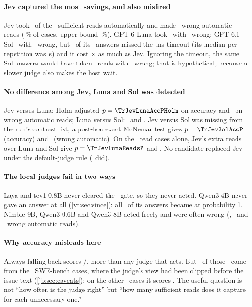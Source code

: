 \paragraph{Jev captured the most savings, and also misfired} Jev took \TrJevReads\ of the \TrReadCases\
sufficient reads automatically and made \TrJevWaK\ wrong automatic reads (\TrJevWaPct\,\% of cases, upper
bound \TrJevWaUpper\,\%). GPT-6 Luna took \TrLunaReads\ with \TrLunaWaK\ wrong; GPT-6.1 Sol \TrSolReads\
with \TrSolWaK\ wrong, but \TrSolTimeouts\ of its \TrSolAnswers\ answers missed the \TrTimeoutMs\,ms timeout
(its median per repetition was \TrSolPfiftyRangeS\,s) and it cost \TrSolJevCostX$\times$ as much as Jev.
Ignoring the timeout, the same Sol answers would have taken \TrSolNoTimeoutReads\ reads with
\TrSolNoTimeoutWa\ wrong; that is hypothetical, because a slower judge also makes the host wait.

\paragraph{No difference among Jev, Luna and Sol was detected} Jev versus Luna: Holm-adjusted $p = \TrJevLunaAccPHolm$ on
accuracy and \TrJevLunaWaPHolm\ on wrong automatic reads; Luna versus Sol: \TrLunaSolAccPHolm\ and
\TrLunaSolWaPHolm. Jev versus Sol was missing from the run's contrast list; a post-hoc exact McNemar test
gives $p = \TrJevSolAccP$ (accuracy) and \TrJevSolWaP\ (wrong automatic). On the \TrReadCases\ read cases
alone, Jev's extra reads over Luna and Sol give $p = \TrJevLunaReadsP$ and \TrJevSolReadsP. No candidate
replaced Jev under the default-judge rule (\TrNReplaces\ did).

\paragraph{The local judges fail in two ways} Laya and tev1 0.8B never cleared the \MinP\ gate, so they
never acted. Qwen3 4B never gave an answer at all (\cref{vt:sec:since}): all \TrQwenFourAbstained\ of
its answers became \code{reason} at probability 1. Nimble 9B, Qwen3 0.6B and Qwen3 8B acted freely and were
often wrong (\TrNimbleWaK, \TrQwenPtSixWaK\ and \TrQwenEightWaK\ wrong automatic reads).



\paragraph{Why accuracy misleads here} Always falling back scores \TrAlwaysK/\TrN, more than any judge
that acts. But \TrAlwaysSThreeK\ of those \TrAlwaysK\ come from the \TrSThree\ SWE-bench cases, where the
judge's view had been clipped before the issue text (\cref{jb:sec:caveats}); on the other \TrSOneTwo\ cases
it scores \TrAlwaysSOneTwoK. The useful question is not ``how often is the judge right'' but ``how many
sufficient reads does it capture for each unnecessary one.''

